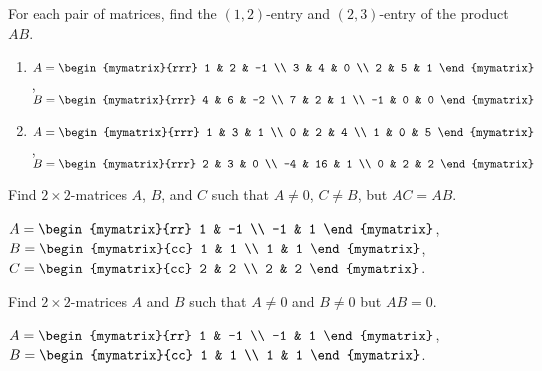 \begin{enumialphparenastyle}
\begin{ex} For each pair of matrices, find the $(1,2)$-entry and
  $(2,3)$-entry of the product $AB$.
  \begin{enumerate}  
  \item 
    $A = \begin{mymatrix}{rrr}
      1 & 2 & -1 \\
      3 & 4 & 0 \\
      2 & 5 & 1 
    \end{mymatrix}$, $B = \begin{mymatrix}{rrr}
      4 & 6 & -2 \\
      7 & 2 & 1 \\
      -1 & 0 & 0 
    \end{mymatrix}$
  \item 
    $A = \begin{mymatrix}{rrr}
      1 & 3 & 1 \\
      0 & 2 & 4 \\
      1 & 0 & 5 
    \end{mymatrix}$, $B = \begin{mymatrix}{rrr}
      2 & 3 & 0 \\
      -4 & 16 & 1 \\
      0 & 2 & 2
    \end{mymatrix}$
  \end{enumerate} 
\end{ex}

\begin{ex} Find $2\times 2$-matrices $A$, $B$, and $C$ such that
  $A\neq 0$, $C\neq B$,
  but $AC=AB$. 
  \begin{sol}
    $A = \begin{mymatrix}{rr}
      1 & -1 \\
      -1 & 1
    \end{mymatrix}$, $B = \begin{mymatrix}{cc}
      1 & 1 \\
      1 & 1
    \end{mymatrix}$, $C = \begin{mymatrix}{cc}
      2 & 2 \\
      2 & 2
    \end{mymatrix}$. 
  \end{sol}
\end{ex}

\begin{ex} Find $2\times 2$-matrices $A$ and $B$ such that $A \neq 0$
  and $B \neq 0$ but $AB = 0$.
  \begin{sol}
    $A = \begin{mymatrix}{rr}
      1 & -1 \\
      -1 & 1
    \end{mymatrix}$, $B = \begin{mymatrix}{cc}
      1 & 1 \\
      1 & 1
    \end{mymatrix}$. 
  \end{sol}
\end{ex}


\end{enumialphparenastyle}
